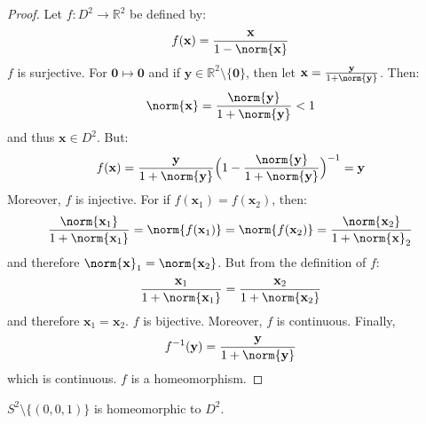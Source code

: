 \documentclass{article}                                                        %
\begin{document}
        \begin{proof}
            Let $f:D^{2}\rightarrow\mathbb{R}^{2}$
            be defined by:
            \begin{equation}
                f(\mathbf{x})=\frac{\mathbf{x}}{1-\norm{\mathbf{x}}}
            \end{equation}
            $f$ is surjective. For $\mathbf{0}\mapsto\mathbf{0}$ and if
            $\mathbf{y}\in\mathbb{R}^2\setminus\{\mathbf{0}\}$, then let
            $\mathbf{x}=\frac{\mathbf{y}}{1+\norm{\mathbf{y}}}$. Then:
            \begin{equation}
                \norm{\mathbf{x}}
                =\frac{\norm{\mathbf{y}}}{1+\norm{\mathbf{y}}}<1
            \end{equation}
            and thus $\mathbf{x}\in D^{2}$. But:
            \begin{equation}
                f(\mathbf{x})
                =\frac{\mathbf{y}}{1+\norm{\mathbf{y}}}
                \Big(
                    1-\frac{\norm{\mathbf{y}}}{1+\norm{\mathbf{y}}}
                \Big)^{-1}
                =\mathbf{y}
            \end{equation}
            Moreover, $f$ is injective.
            For if
            $f(\mathbf{x}_{1})=f(\mathbf{x}_{2})$,
            then:
            \begin{equation}
                \frac{\norm{\mathbf{x}_{1}}}{1+\norm{\mathbf{x}_{1}}}
                =\norm{f(\mathbf{x}_{1})}
                =\norm{f(\mathbf{x}_{2})}
                =\frac{\norm{\mathbf{x}_{2}}}{1+\norm{\mathbf{x}}_{2}}
            \end{equation}
            and therefore
            $\norm{\mathbf{x}}_{1}=\norm{\mathbf{x}_{2}}$.
            But from the definition of $f$:
            \begin{equation}
                \frac{\mathbf{x}_{1}}{1+\norm{\mathbf{x}_{1}}}
                =\frac{\mathbf{x}_{2}}{1+\norm{\mathbf{x}_{2}}}
            \end{equation}
            and therefore $\mathbf{x}_{1}=\mathbf{x}_{2}$.
            $f$ is bijective.
            Moreover, $f$ is continuous. Finally,
            \begin{equation}
                f^{-1}(\mathbf{y})
                =\frac{\mathbf{y}}{1+\norm{\mathbf{y}}}                    
            \end{equation}
            which is continuous. $f$ is a homeomorphism.
        \end{proof}
        \begin{theorem}
            $S^{2}\setminus\{(0,0,1)\}$ is homeomorphic to $D^{2}$.
        \end{theorem}
\end{document}
